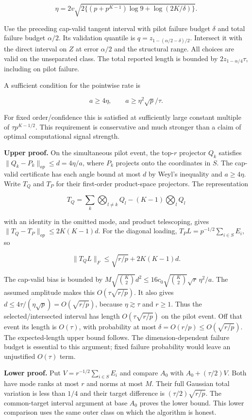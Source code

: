 \documentclass[
  10pt,
]{article}
\begin{document}
\[\eta=2v\sqrt{2\{(p+p^{K-1})\log9+\log(2K/\delta)\}}.\]

Use the preceding cap-valid tangent interval with pilot failure budget
\(\delta\) and total failure budget \(\alpha/2\). Its validation
quantile is \(q=z_{1-(\alpha/2-\delta)/2}\). Intersect it with the
direct interval on \(Z\) at error \(\alpha/2\) and the structural range.
All choices are valid on the unseparated class. The total reported
length is bounded by \(2z_{1-\alpha/4}\tau\), including on pilot
failure.

A sufficient condition for the pointwise rate is

\[a\ge 4\eta,\qquad a\ge \eta^2\sqrt p/\tau.\]

For fixed order/confidence this is satisfied at sufficiently large
constant multiple of \(\tau p^{K-1/2}\). This requirement is
conservative and much stronger than a claim of optimal computational
signal strength.

\textbf{Upper proof.} On the simultaneous pilot event, the top-\(r\)
projector \(Q_k\) satisfies \(\|Q_k-P_k\|_{op}\le d=4\eta/a\), where
\(P_k\) projects onto the coordinates in \(S\). The cap-valid
certificate has each angle bound at most \(d\) by Weyl's inequality and
\(a\ge4\eta\). Write \(T_Q\) and \(T_P\) for their first-order
product-space projectors. The representation

\[T_Q=\sum_k\bigotimes_{l\ne k}Q_l-(K-1)\bigotimes_l Q_l\]

with an identity in the omitted mode, and product telescoping, gives
\(\|T_Q-T_P\|_{op}\le2K(K-1)d\). For the diagonal loading,
\(T_PL=p^{-1/2}\sum_{i\in S}E_i\), so

\[\|T_QL\|_F\le\sqrt{r/p}+2K(K-1)d.\]

The cap-valid bias is bounded by \(M\sqrt{\binom K2}d^2\le
16c_0\sqrt{\binom K2}\sqrt r\,\eta^2/a\). The assumed amplitude makes
this \(O(\tau\sqrt{r/p})\). It also gives
\(d\le4\tau/(\eta\sqrt p)=O(\sqrt{r/p})\), because \(\eta\gtrsim\tau\)
and \(r\ge1\). Thus the selected/intersected interval has length
\(O(\tau\sqrt{r/p})\) on the pilot event. Off that event its length is
\(O(\tau)\), with probability at most
\(\delta=O(r/p)\le O(\sqrt{r/p})\). The expected-length upper bound
follows. The dimension-dependent failure budget is essential to this
argument; fixed failure probability would leave an unjustified
\(O(\tau)\) term.

\textbf{Lower proof.} Put \(V=r^{-1/2}\sum_{i\in S}E_i\) and compare
\(A_0\) with \(A_0+(\tau/2)V\). Both have mode ranks at most \(r\) and
norms at most \(M\). Their full Gaussian total variation is less than
\(1/4\) and their target difference is \((\tau/2)\sqrt{r/p}\). The
common-target interval argument at base \(A_0\) proves the lower bound.
This lower comparison uses the same outer class on which the algorithm
is honest.
\end{document}
